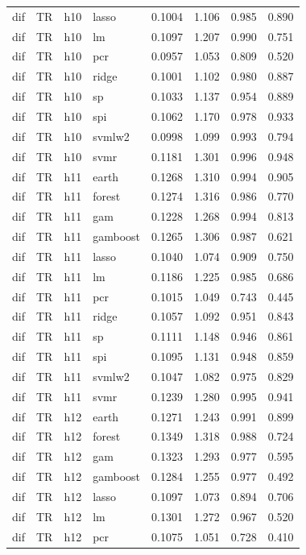 \begin{ThreePartTable}
\begin{longtable}[t]{llclcccc}
dif & TR & h10 & lasso & 0.1004 & 1.106 & 0.985 & 0.890\\
dif & TR & h10 & lm & 0.1097 & 1.207 & 0.990 & 0.751\\
dif & TR & h10 & pcr & 0.0957 & 1.053 & 0.809 & 0.520\\
dif & TR & h10 & ridge & 0.1001 & 1.102 & 0.980 & 0.887\\
dif & TR & h10 & sp & 0.1033 & 1.137 & 0.954 & 0.889\\
dif & TR & h10 & spi & 0.1062 & 1.170 & 0.978 & 0.933\\
dif & TR & h10 & svmlw2 & 0.0998 & 1.099 & 0.993 & 0.794\\
dif & TR & h10 & svmr & 0.1181 & 1.301 & 0.996 & 0.948\\
\addlinespace
dif & TR & h11 & earth & 0.1268 & 1.310 & 0.994 & 0.905\\
dif & TR & h11 & forest & 0.1274 & 1.316 & 0.986 & 0.770\\
dif & TR & h11 & gam & 0.1228 & 1.268 & 0.994 & 0.813\\
dif & TR & h11 & gamboost & 0.1265 & 1.306 & 0.987 & 0.621\\
dif & TR & h11 & lasso & 0.1040 & 1.074 & 0.909 & 0.750\\
dif & TR & h11 & lm & 0.1186 & 1.225 & 0.985 & 0.686\\
dif & TR & h11 & pcr & 0.1015 & 1.049 & 0.743 & 0.445\\
dif & TR & h11 & ridge & 0.1057 & 1.092 & 0.951 & 0.843\\
dif & TR & h11 & sp & 0.1111 & 1.148 & 0.946 & 0.861\\
dif & TR & h11 & spi & 0.1095 & 1.131 & 0.948 & 0.859\\
dif & TR & h11 & svmlw2 & 0.1047 & 1.082 & 0.975 & 0.829\\
dif & TR & h11 & svmr & 0.1239 & 1.280 & 0.995 & 0.941\\
\addlinespace
dif & TR & h12 & earth & 0.1271 & 1.243 & 0.991 & 0.899\\
dif & TR & h12 & forest & 0.1349 & 1.318 & 0.988 & 0.724\\
dif & TR & h12 & gam & 0.1323 & 1.293 & 0.977 & 0.595\\
dif & TR & h12 & gamboost & 0.1284 & 1.255 & 0.977 & 0.492\\
dif & TR & h12 & lasso & 0.1097 & 1.073 & 0.894 & 0.706\\
dif & TR & h12 & lm & 0.1301 & 1.272 & 0.967 & 0.520\\
dif & TR & h12 & pcr & 0.1075 & 1.051 & 0.728 & 0.410\\

\end{longtable}
\end{ThreePartTable}
